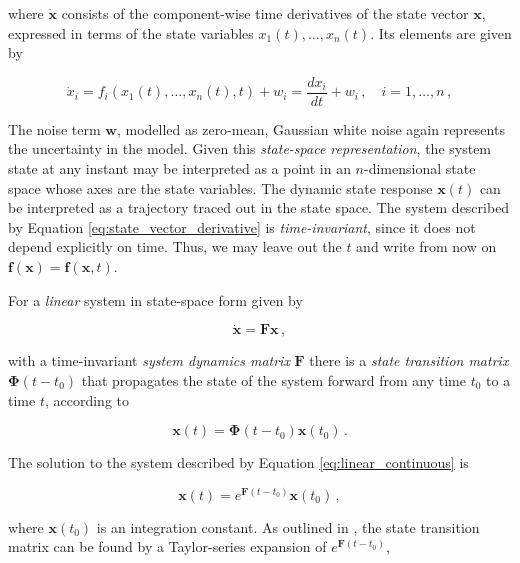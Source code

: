 \noindent
where $\dot{\mathbf{x}}$ consists of the component-wise time derivatives of the state vector $\mathbf{x}$, expressed in terms of the state variables $x_1(t), \dots, x_n(t)$. Its elements are given by

\begin{equation}
  \dot{x}_i = f_i(x_1(t), \dots, x_n(t), t) + w_i = \frac{dx_i}{dt} + w_i\,, \quad i = 1, \dots, n\,,
\end{equation}

\noindent
The noise term $\mathbf{w}$, modelled as zero-mean, Gaussian white noise again represents the uncertainty in the model. Given this \emph{state-space representation}, the system state at any instant may be interpreted as a point in an $n$-dimensional state space whose axes are the state variables. The dynamic state response $\mathbf{x}(t)$ can be interpreted as a trajectory traced out in the state space. The system described by Equation \ref{eq:state_vector_derivative} is \emph{time-invariant}, since it does not depend explicitly on time. Thus, we may leave out the $t$ and write from now on $\mathbf{f}(\mathbf{x}) = \mathbf{f}(\mathbf{x}, t)$.

For a \emph{linear} system in state-space form given by

\begin{equation}\label{eq:linear_continuous}
  \dot{\mathbf{x}} = \mathbf{F} \mathbf{x}\,,
\end{equation}

\noindent
with a time-invariant \emph{system dynamics matrix} $\mathbf{F}$ there is a \emph{state transition matrix} $\bm{\Phi}(t-t_0)$ that propagates the state of the system forward from any time $t_0$ to a time $t$, according to

\begin{equation}
  \mathbf{x}(t) = \bm{\Phi}(t-t_0) \mathbf{x}(t_0)\,.
\end{equation}

\noindent
The solution to the system described by Equation \ref{eq:linear_continuous} is 

\begin{equation}
  \mathbf{x}(t) = e^{\mathbf{F}(t-t_0)} \mathbf{x}(t_0)\,,
\end{equation}

\noindent
where $\mathbf{x}(t_0)$ is an integration constant. As outlined in \cite{zarchan2009fundamentals}, the state transition matrix can be found by a Taylor-series expansion of $e^{\mathbf{F}(t-t_0)}$,

